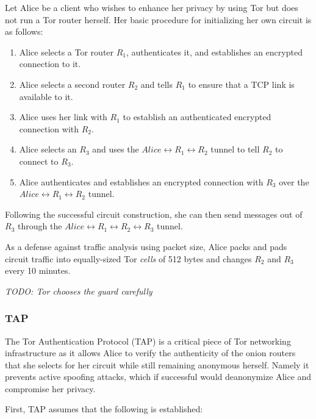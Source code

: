 Let Alice be a client who wishes to enhance her privacy by using Tor but does not run a Tor router herself. Her basic procedure for initializing her own circuit is as follows:

\begin{enumerate}
	\item Alice selects a Tor router $ R_{1} $, authenticates it, and establishes an encrypted connection to it.
	\item Alice selects a second router $ R_{2} $ and tells $ R_{1} $ to ensure that a TCP link is available to it. 
	\item Alice uses her link with $ R_{1} $ to establish an authenticated encrypted connection with $ R_{2} $.
	\item Alice selects an $ R_{3} $ and uses the $ Alice \leftrightarrow R_{1} \leftrightarrow R_{2} $ tunnel to tell $ R_{2} $ to connect to $ R_{3} $.
	\item Alice authenticates and establishes an encrypted connection with $ R_{3} $ over the $ Alice \leftrightarrow R_{1} \leftrightarrow R_{2} $ tunnel.
\end{enumerate}

Following the successful circuit construction, she can then send messages out of $ R_{3} $ through the $ Alice \leftrightarrow R_{1} \leftrightarrow R_{2} \leftrightarrow R_{3} $ tunnel.

As a defense against traffic analysis using packet size, Alice packs and pads circuit traffic into equally-sized Tor \emph{cells} of 512 bytes and changes $ R_{2} $ and $ R_{3} $ every 10 minutes.\cite{mccoy2008shining}

\emph{TODO: Tor chooses the guard carefully}

\subsubsection{TAP}

The Tor Authentication Protocol (TAP) is a critical piece of Tor networking infrastructure as it allows Alice to verify the authenticity of the onion routers that she selects for her circuit while still remaining anonymous herself. Namely it prevents active spoofing attacks, which if successful would deanonymize Alice and compromise her privacy.

First, TAP assumes that the following is established:

